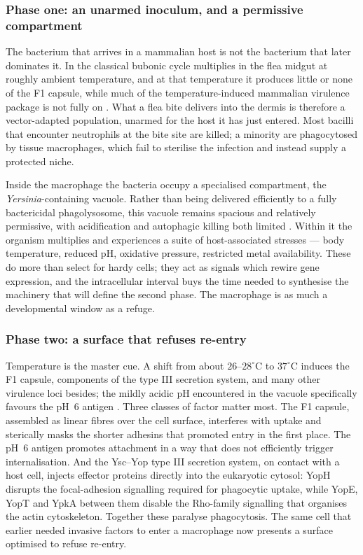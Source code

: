 \subsubsection*{Phase one: an unarmed inoculum, and a permissive compartment}

The bacterium that arrives in a mammalian host is not the bacterium that later
dominates it. In the classical bubonic cycle \yp{} multiplies in the flea
midgut at roughly ambient temperature, and at that temperature it produces
little or none of the F1 capsule, while much of the temperature-induced
mammalian virulence package is not fully on \cite{KeEtAl2013}. What a flea bite
delivers into the dermis is therefore a vector-adapted population, unarmed for
the host it has just entered. Most bacilli that encounter neutrophils at the
bite site are killed; a minority are phagocytosed by tissue macrophages, which
fail to sterilise the infection and instead supply a protected niche.

Inside the macrophage the bacteria occupy a specialised compartment, the
\textit{Yersinia}-containing vacuole. Rather than being delivered efficiently
to a fully bactericidal phagolysosome, this vacuole remains spacious and
relatively permissive, with acidification and autophagic killing both limited
\cite{PujolBliska2005,ConnorEtAl2018}. Within it the organism multiplies and
experiences a suite of host-associated stresses --- body temperature, reduced
pH, oxidative pressure, restricted metal availability. These do more than
select for hardy cells; they act as signals which rewire gene expression, and
the intracellular interval buys the time needed to synthesise the machinery
that will define the second phase. The macrophage is as much a developmental
window as a refuge.

\subsubsection*{Phase two: a surface that refuses re-entry}

Temperature is the master cue. A shift from about $26\text{--}28^\circ$C to
$37^\circ$C induces the F1 capsule, components of the type III secretion
system, and many other virulence loci besides; the mildly acidic pH encountered
in the vacuole specifically favours the pH~6 antigen \cite{KeEtAl2013}. Three
classes of factor matter most. The F1 capsule, assembled as linear fibres over
the cell surface, interferes with uptake and sterically masks the shorter
adhesins that promoted entry in the first place. The pH~6 antigen promotes
attachment in a way that does not efficiently trigger internalisation. And the
Ysc--Yop type III secretion system, on contact with a host cell, injects
effector proteins directly into the eukaryotic cytosol: YopH disrupts the
focal-adhesion signalling required for phagocytic uptake, while YopE, YopT and
YpkA between them disable the Rho-family signalling that organises the actin
cytoskeleton. Together these paralyse phagocytosis. The same cell that earlier
needed invasive factors to enter a macrophage now presents a surface optimised
to refuse re-entry.

